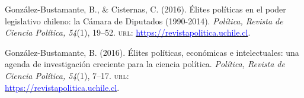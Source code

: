 \begin{publications}
\begin{benumerate}{14}

\item{González-Bustamante, B., \& Cisternas, C. (2016). Élites políticas en el poder legislativo chileno: la Cámara de Diputados (1990-2014). {\itshape Política, Revista de Ciencia Política, 54}(1), 19--52. {\scshape url:} \href{https://revistapolitica.uchile.cl/index.php/RP/article/view/42691}{\textcolor{blue}{https://revistapolitica.uchile.cl}}.}\vspace{1mm}


\item{González-Bustamante, B. (2016). Élites políticas, económicas e intelectuales: una agenda de investigación creciente para la ciencia política. {\itshape Política, Revista de Ciencia Política, 54}(1), 7--17. {\scshape url:} \\ \href{https://revistapolitica.uchile.cl/index.php/RP/article/view/42690}{\textcolor{blue}{https://revistapolitica.uchile.cl}}.}\vspace{1mm}



\end{benumerate}
\end{publications}
